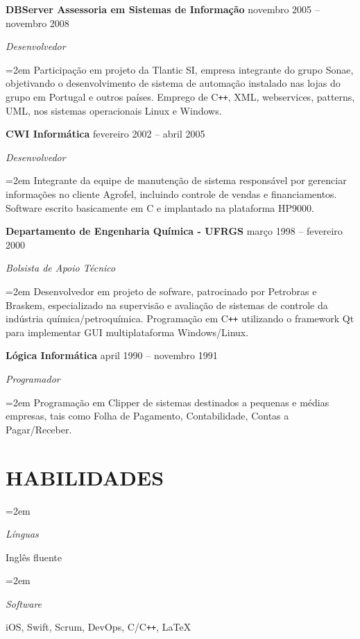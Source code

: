 \documentclass[paper=a4,fontsize=11pt]{scrartcl} %
\newlength{\spacebox}
\newcommand{\sepspace}{\vspace*{1em}}		%
\newcommand{\NewPart}[1]{\section*{\uppercase{#1}}}
\newcommand{\PersonalEntry}[2]{
		\noindent\hangindent=2em\hangafter=0 %
		\parbox{\spacebox}{        %
		\textit{#1}}		       %
		\hspace{1.5em} #2 \par}    %
\newcommand{\SkillsEntry}[2]{      %
		\noindent\hangindent=2em\hangafter=0 %
		\parbox{\spacebox}{        %
		\textit{#1}}			   %
		\hspace{1.5em} #2 \par}    %
\newcommand{\EducationEntry}[4]{
		\noindent \textbf{#1} \hfill      %
        #2 \par
		\noindent \textit{#3} \par        %
		\noindent\hangindent=2em\hangafter=0 \small #4 %
		\normalsize \par}
\newcommand{\WorkEntry}[4]{				  %
		\noindent \textbf{#1} \hfill      %
        #2 \par
		\noindent \textit{#3} \par        %
		\noindent\hangindent=2em\hangafter=0 \small #4 %
		\normalsize \par}
\begin{document}
\WorkEntry{DBServer Assessoria em Sistemas de Informação}{novembro 2005 – novembro 2008}{Desenvolvedor}{Participação em projeto da Tlantic SI, empresa integrante do grupo Sonae, objetivando o desenvolvimento de sistema de automação instalado nas lojas do grupo em Portugal e outros países. Emprego de C\texttt{++}, XML, webservices, patterns, UML, nos sistemas operacionais Linux e Windows.}
\sepspace
\sepspace

\WorkEntry{CWI Informática}{fevereiro 2002 – abril 2005}{Desenvolvedor}{Integrante da equipe de manutenção de sistema responsável por gerenciar informações no cliente Agrofel, incluindo controle de vendas e financiamentos. Software escrito basicamente em C e implantado na plataforma HP9000.}
\sepspace
\sepspace

\WorkEntry{Departamento de Engenharia Química - UFRGS}{março 1998 – fevereiro 2000}{Bolsista de Apoio Técnico}{Desenvolvedor em projeto de sofware, patrocinado por Petrobras e Braskem, especializado na supervisão e avaliação de sistemas de controle da indústria química/petroquímica. Programação em C\texttt{++} utilizando o framework Qt para implementar GUI multiplataforma Windows/Linux.}
\sepspace
\sepspace

\WorkEntry{Lógica Informática}{april 1990 – novembro 1991}{Programador}{Programação em Clipper de sistemas destinados a pequenas e médias empresas, tais como Folha de Pagamento, Contabilidade, Contas a Pagar/Receber.}

\NewPart{Habilidades}{}

\SkillsEntry{Línguas}{Inglês fluente}

\SkillsEntry{Software}{iOS, Swift, Scrum, DevOps, C/C\texttt{++}, \LaTeX}


\end{document}
